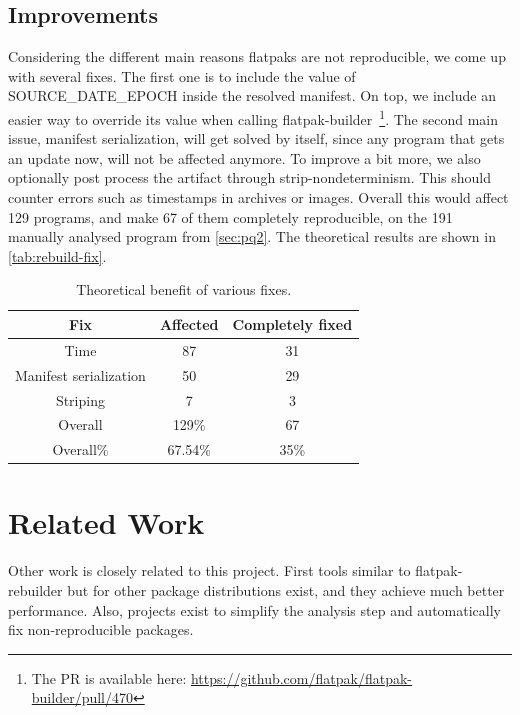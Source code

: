 \documentclass[a4paper,11pt,oneside]{report}
\theoremstyle{definition}
\newcommand{\sysname}{flatpak-rebuilder\xspace}
\newcommand{\fb}{flatpak-builder\xspace}
\newcommand{\sde}{SOURCE\_DATE\_EPOCH\xspace}
\begin{document}
\section{Improvements}
\label{sec:imp}
Considering the different main reasons flatpaks are not reproducible, we come
up with several fixes. The first one is to include the value of \sde inside the
resolved manifest. On top, we include an easier way to override its value when
calling \fb~\footnote{The PR is available here:
\url{https://github.com/flatpak/flatpak-builder/pull/470}}. The second main
issue, manifest serialization, will get solved by itself, since any program
that gets an update now, will not be affected anymore. To improve a bit more,
we also optionally post process the artifact through strip-nondeterminism. This
should counter errors such as timestamps in archives or images. Overall this
would affect 129 programs, and make 67 of them completely reproducible, on the
191 manually analysed program from \autoref{sec:pq2}. The theoretical results
are shown in \autoref{tab:rebuild-fix}.

\begin{table}[h]
    \centering
        \begin{tabular}{|c|c|c|}
            \hline
            Fix & Affected & Completely fixed\\
            \hline
            Time & 87 & 31\\
            \hline
            Manifest serialization & 50 & 29 \\
            \hline
            Striping & 7 & 3\\
            \hline
            Overall & 129\% & 67\\
            \hline
            Overall\% & 67.54\% & 35\%\\
            \hline
        \end{tabular}
    \caption{Theoretical benefit of various fixes.}
    \label{tab:rebuild-fix}
\end{table}

\chapter{Related Work}
\label{chap:relw}

Other work is closely related to this project. First tools similar to \sysname
but for other package distributions exist, and they achieve much better
performance. Also, projects exist to simplify the analysis step and
automatically fix non-reproducible packages.
\end{document}
